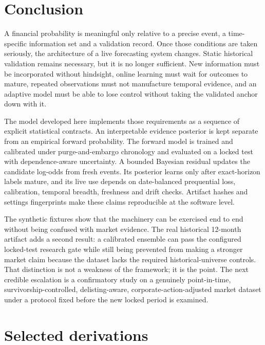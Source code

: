 \documentclass[11pt]{article}
\begin{document}
\section{Conclusion}

A financial probability is meaningful only relative to a precise event, a time-specific information set and a validation record. Once those conditions are taken seriously, the architecture of a live forecasting system changes. Static historical validation remains necessary, but it is no longer sufficient. New information must be incorporated without hindsight, online learning must wait for outcomes to mature, repeated observations must not manufacture temporal evidence, and an adaptive model must be able to lose control without taking the validated anchor down with it.

The model developed here implements those requirements as a sequence of explicit statistical contracts. An interpretable evidence posterior is kept separate from an empirical forward probability. The forward model is trained and calibrated under purge-and-embargo chronology and evaluated on a locked test with dependence-aware uncertainty. A bounded Bayesian residual updates the candidate log-odds from fresh events. Its posterior learns only after exact-horizon labels mature, and its live use depends on date-balanced prequential loss, calibration, temporal breadth, freshness and drift checks. Artifact hashes and settings fingerprints make these claims reproducible at the software level.

The synthetic fixtures show that the machinery can be exercised end to end without being confused with market evidence. The real historical 12-month artifact adds a second result: a calibrated ensemble can pass the configured locked-test research gate while still being prevented from making a stronger market claim because the dataset lacks the required historical-universe controls. That distinction is not a weakness of the framework; it is the point. The next credible escalation is a confirmatory study on a genuinely point-in-time, survivorship-controlled, delisting-aware, corporate-action-adjusted market dataset under a protocol fixed before the new locked period is examined.

\appendix

\section{Selected derivations}
\label{app:derivations}
\end{document}
